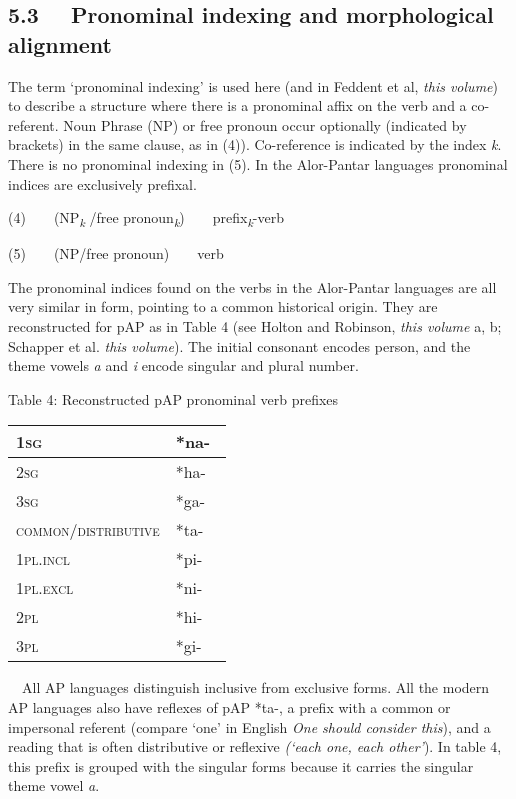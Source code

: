 \subsection[5.3 \ \ Pronominal indexing and morphological alignment]{5.3 \ \ Pronominal indexing and morphological alignment}
The term {\textquoteleft}pronominal indexing{\textquoteright} is used here (and in Feddent et al, \textit{this volume}) to describe a structure where there is a pronominal affix on the verb and a co-referent. Noun Phrase (NP) or free pronoun occur optionally (indicated by brackets) in the same clause, as in (4)). Co-reference is indicated by the index \textit{k}. There is no pronominal indexing in (5). In the Alor-Pantar languages pronominal indices are exclusively prefixal.

(4)\ \ \ \ (NP\textit{\textsubscript{k }}/free pronoun\textit{\textsubscript{k}})\ \ \ \ prefix\textit{\textsubscript{k}}{}-verb

(5)\ \ \ \ (NP/free pronoun)\ \ \ \ verb

The pronominal indices found on the verbs in the Alor-Pantar languages are all very similar in form, pointing to a common historical origin. They are reconstructed for pAP as in Table 4 (see Holton and Robinson, \textit{this volume} a, b; Schapper et al. \textit{this volume}). The initial consonant encodes person, and the theme vowels \textit{a }and \textit{i} encode singular and plural number.  

{\centering
Table 4: Reconstructed pAP pronominal verb prefixes 
\par}

\begin{center}
\tablehead{}
\begin{supertabular}{|m{1.6344599in}|m{0.56365985in}|}
\hline
\scshape 1sg &
*na-\\\hline
\scshape 2sg &
*ha-\\\hline
\scshape 3sg &
*ga-\\\hline
\scshape common/distributive &
*ta-\\\hline
\scshape 1pl.incl &
*pi-\\\hline
\scshape 1pl.excl &
*ni-\ \ \\\hline
\scshape 2pl &
*hi-\\\hline
\scshape 3pl &
*gi-\\\hline
\end{supertabular}
\end{center}
\ \ All AP languages distinguish inclusive from exclusive forms. All the modern AP languages also have reflexes of pAP *ta-, a prefix with a common or impersonal referent (compare {\textquoteleft}one{\textquoteright}\textit{ }in English \textit{One should consider this}), and a reading that is often distributive or reflexive \textit{({\textquoteleft}each one, each other{\textquoteright}}). In table 4, this prefix is grouped with the singular forms because it carries the singular theme vowel \textit{a}.

